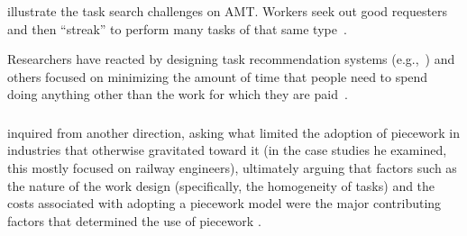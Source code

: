 \documentclass[trackingWork]{subfiles}
\begin{document}


\citeauthor{taskSearch} illustrate the task search challenges on AMT.%
Workers seek out good requesters~\cite{martin2014being} and then  ``streak'' to perform many tasks of that same type~\cite{taskSearch}.

Researchers have reacted by designing task recommendation systems (e.g.,~\cite{Cosley:2007:SUI:1216295.1216309})
and others focused on minimizing the amount of time that people need to spend doing anything other than the work for which they are paid~\cite{callison2014crowd}.



\subsubsection{\pieceworkpers}
\citeauthor{Brown01041990} inquired from another direction, asking
what limited the adoption of piecework in industries that otherwise gravitated toward it
(in the case studies he examined, this mostly focused on railway engineers),
ultimately arguing that factors such as the nature of the work design
(specifically, the homogeneity of tasks) and the costs associated with adopting a piecework model
were the major contributing factors that determined the use of piecework
\cite{Brown01041990}.
\end{document}
